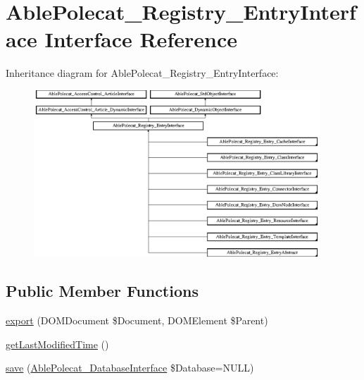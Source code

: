 \hypertarget{interface_able_polecat___registry___entry_interface}{}\section{Able\+Polecat\+\_\+\+Registry\+\_\+\+Entry\+Interface Interface Reference}
\label{interface_able_polecat___registry___entry_interface}
Inheritance diagram for Able\+Polecat\+\_\+\+Registry\+\_\+\+Entry\+Interface\+:\begin{figure}[H]
\begin{center}
\leavevmode
\includegraphics[height=6.260162cm]{interface_able_polecat___registry___entry_interface}
\end{center}
\end{figure}
\subsection*{Public Member Functions}
\begin{DoxyCompactItemize}
\item 
\hyperlink{interface_able_polecat___registry___entry_interface_a0a05b2e4b3a44390eeb042064e427b1a}{export} (D\+O\+M\+Document \$Document, D\+O\+M\+Element \$Parent)
\item 
\hyperlink{interface_able_polecat___registry___entry_interface_ada825a3515aa1569a1a2893c47a643b9}{get\+Last\+Modified\+Time} ()
\item 
\hyperlink{interface_able_polecat___registry___entry_interface_a999eef977eb899167ae02f83dd26a4ae}{save} (\hyperlink{interface_able_polecat___database_interface}{Able\+Polecat\+\_\+\+Database\+Interface} \$Database=N\+U\+L\+L)
\end{DoxyCompactItemize}
